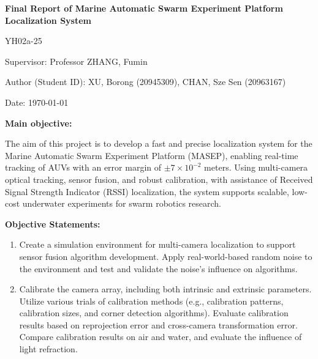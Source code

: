 \documentclass[11pt]{article}
\newcommand{\cn}[1]{\begin{CJK}{UTF8}{gbsn}#1\end{CJK}}
\newcommand{\yh}[1]{\noindent{\color{blue}\textbf{yh: }{\cn{#1}}}}
\begin{document}
\pagestyle{fancy}
\fancyhf{} 
\fancyfoot[R]{\thepage}

\begin{titlepage}
    \centering
    {\Huge\bfseries Final Report of Marine Automatic Swarm Experiment Platform Localization System \par}
    \vspace{1.5cm}
    {\Large YH02a-25 \par}
    \vspace{0.5cm}
    {\large Supervisor: Professor ZHANG, Fumin \par}
    {\large Author (Student ID): XU, Borong (20945309), CHAN, Sze Sen (20963167) \par}
    \vspace{0.5cm}
    {\large Date: \today \par}
    \vspace{0.5cm}
    {\large\bfseries Main objective: \par}
    \begin{flushleft}
        The aim of this project is to develop a fast and precise localization system for the Marine Automatic Swarm Experiment Platform (MASEP), enabling real-time tracking of AUVs with an error margin of $\pm 7\times 10^{-2}$ meters. Using multi-camera optical tracking, sensor fusion, and robust calibration, with assistance of Received Signal Strength Indicator (RSSI) localization, the system supports scalable, low-cost underwater experiments for swarm robotics research.
    \vspace{0.5cm}
    \end{flushleft}
    {\large\bfseries Objective Statements: \par}
    \begin{enumerate}
        \item Create a simulation environment for multi-camera localization to support sensor fusion algorithm development. Apply real-world-based random noise to the environment and test and validate the noise's influence on algorithms.
        \item Calibrate the camera array, including both intrinsic and extrinsic parameters. Utilize various trials of calibration methods (e.g., calibration patterns, calibration sizes, and corner detection algorithms). Evaluate calibration results based on reprojection error and cross-camera transformation error. Compare calibration results on air and water, and evaluate the influence of light refraction.

\end{enumerate}
\end{titlepage}
\end{document}
